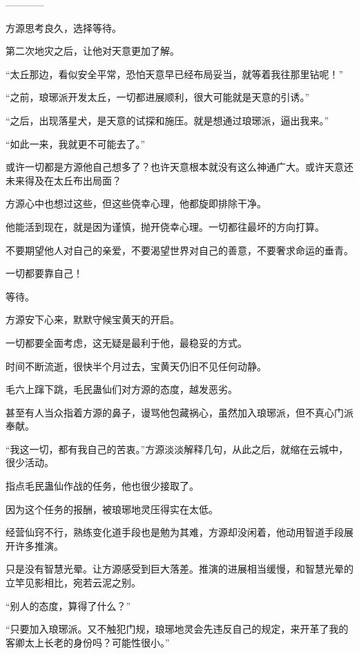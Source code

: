 
\begin{this_body}

------------

方源思考良久，选择等待。

第二次地灾之后，让他对天意更加了解。

“太丘那边，看似安全平常，恐怕天意早已经布局妥当，就等着我往那里钻呢！”

“之前，琅琊派开发太丘，一切都进展顺利，很大可能就是天意的引诱。”

“之后，出现落星犬，是天意的试探和施压。就是想通过琅琊派，逼出我来。”

“如此一来，我就更不可能去了。”

或许一切都是方源他自己想多了？也许天意根本就没有这么神通广大。或许天意还未来得及在太丘布出局面？

方源心中也想过这些，但这些侥幸心理，他都旋即排除干净。

他能活到现在，就是因为谨慎，抛开侥幸心理。一切都往最坏的方向打算。

不要期望他人对自己的亲爱，不要渴望世界对自己的善意，不要奢求命运的垂青。

一切都要靠自己！

等待。

方源安下心来，默默守候宝黄天的开启。

一切都要全面考虑，这无疑是最利于他，最稳妥的方式。

时间不断流逝，很快半个月过去，宝黄天仍旧不见任何动静。

毛六上蹿下跳，毛民蛊仙们对方源的态度，越发恶劣。

甚至有人当众指着方源的鼻子，谩骂他包藏祸心，虽然加入琅琊派，但不真心门派奉献。

“我这一切，都有我自己的苦衷。”方源淡淡解释几句，从此之后，就缩在云城中，很少活动。

指点毛民蛊仙作战的任务，他也很少接取了。

因为这个任务的报酬，被琅琊地灵压得实在太低。

经营仙窍不行，熟练变化道手段也是勉为其难，方源却没闲着，他动用智道手段展开许多推演。

只是没有智慧光晕。让方源感受到巨大落差。推演的进展相当缓慢，和智慧光晕的立竿见影相比，宛若云泥之别。

“别人的态度，算得了什么？”

“只要加入琅琊派。又不触犯门规，琅琊地灵会先违反自己的规定，来开革了我的客卿太上长老的身份吗？可能性很小。”


\end{this_body}
